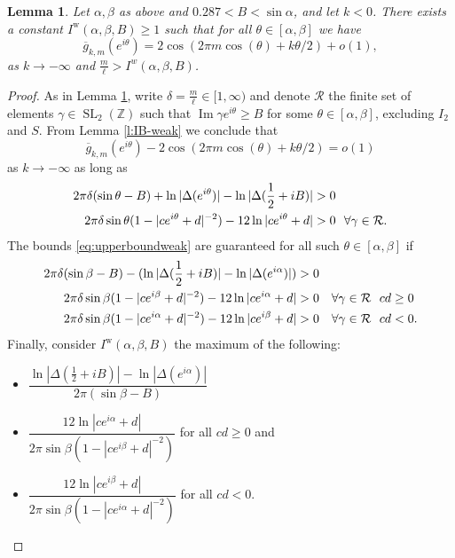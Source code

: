 \documentclass[12pt]{amsart}
\theoremstyle{plain} %
\newtheorem{lemma}      [theorem]{Lemma}
\theoremstyle{definition}
\theoremstyle{remark}
\numberwithin{equation}{section}
\newcommand{\w}{\operatorname{w}}
\newcommand{\SL}{\operatorname{SL}}
\renewcommand{\Im}{\operatorname{Im}}
\begin{document}
\begin{lemma}\label{l:miller-approx-arc-weak}
Let $\alpha, \beta$ as above and $0.287<B<\sin \alpha$, and let $k<0$. 
There exists a constant $I^{\w}(\alpha,\beta,B)\geq 1$ such that 
for all $\theta\in [\alpha,\beta]$ we have
\[\overline{g}_{k,m}(e^{i \theta})=2\cos\left(2\pi m\cos
(\theta)+k\theta/2\right)+o(1),\]
as $k\to -\infty$ and $\frac{m}{\ell}>I^w(\alpha,\beta,B)$.
\end{lemma}
\begin{proof}
As in Lemma \ref{l:miller-approx-arc-weak}, write $\delta=\frac{m}{\ell}\in [1,\infty)$ and denote $\mathcal{R}$ the finite set of elements $\gamma\in \SL_2(\mathbb{Z})$ such that $\Im \gamma e^{i\theta}\geq B$ for some $\theta\in [\alpha,\beta]$, excluding $I_2$ and $S$. From Lemma \ref{l:IB-weak} we conclude that 
\[\overline{g}_{k,m}(e^{i \theta})-2\cos\left(2\pi m\cos
(\theta)+k\theta/2\right)=o(1)\]
as $k\to-\infty$ as long as 
\begin{align}\label{eq:upperboundweak}
2\pi \delta(\sin\theta-B) +\ln
  |\Delta(e^{i\theta})|-\ln|\Delta(\frac{1}{2}+iB)|&>0\\
  2\pi\delta \sin\theta(1-|ce^{i\theta}+d|^{-2})-12\ln|ce^{i\theta}+d|&>0\ \ \forall \gamma\in \mathcal{R}.\notag
\end{align}
The bounds \eqref{eq:upperboundweak} are guaranteed for
all such $\theta\in [\alpha,\beta]$ if
\begin{align}\label{eq:upperboundabweak}
2\pi \delta (\sin\beta-B) -
  (\ln|\Delta(\frac{1}{2}+iB)|-\ln|\Delta(e^{i\alpha})|)&>0\\
  2\pi
  \delta\sin\beta(1-|ce^{i\beta}+d|^{-2})-12\ln|ce^{i\alpha}+d|&>0\ \ \ \forall \gamma\in \mathcal{R}\ \ cd\geq 0\notag\\
  2\pi
  \delta \sin\beta(1-|ce^{i\alpha}+d|^{-2})-12\ln|ce^{i\beta}+d|&>0\ \ \ \forall \gamma\in \mathcal{R}\ \ cd<0.\notag
\end{align}
Finally, consider $I^{\w}(\alpha, \beta, B)$ the
maximum of the following:
\begin{itemize}
\item $\dfrac{\ln|\Delta(\frac{1}{2}+iB)|-\ln|\Delta(e^{i\alpha})|}{2\pi
  (\sin\beta-B)}$
\item $\dfrac{12\ln|ce^{i\alpha}+d|}{2\pi\sin \beta
  (1-|ce^{i\beta}+d|^{-2})}$ for all $cd\geq 0$ and
\item $\dfrac{12\ln|ce^{i\beta}+d|}{2\pi\sin \beta (1-|ce^{i\alpha}+d|^{-2})}$ for all $cd< 0$.
\end{itemize}
\end{proof}
\end{document}
